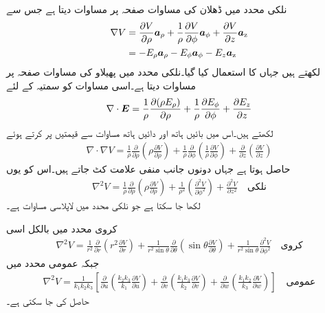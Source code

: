 نلکی محدد میں ڈھلان کی مساوات صفحہ  پر مساوات  دیتا ہے جس سے 
\begin{gather}
\begin{aligned}\label{مساوات_لاپلاس_نلکی_پھیلاو_الف}
\nabla V &= \frac{\partial V}{\partial \rho} {\boldsymbol{a}}_{\rho}+\frac{1}{\rho}\frac{\partial V}{\partial \phi}  {\boldsymbol{a}}_{\phi}+\frac{\partial V}{\partial z}{\boldsymbol{a}}_{\textup{z}}\\
&=-E_\rho {\boldsymbol{a}}_{\rho}-E_\phi {\boldsymbol{a}}_{\phi}-E_z {\boldsymbol{a}}_{\textup{z}} 
\end{aligned}
\end{gather}
لکھتے  ہیں جہاں  کا استعمال کیا گیا۔نلکی محدد میں پھیلاو کی مساوات صفحہ  پر مساوات  دیتا ہے۔اسی مساوات کو سمتیہ  کے لئے
 \begin{align*}
\nabla \cdot {\ensuremath{{\boldsymbol{E}}}}=\frac{1}{\rho}\frac{\partial (\rho E_{\rho})}{\partial \rho}+\frac{1}{\rho}\frac{\partial E_{\phi}}{\partial \phi}  +  \frac{\partial E_{z}}{\partial z}
\end{align*}
لکھتے ہیں۔اس میں بائیں ہاتھ   اور دائیں ہاتھ مساوات  سے قیمتیں پر کرتے ہوئے
\begin{align*}
\nabla \cdot \nabla V=\frac{1}{\rho}\frac{\partial }{\partial \rho}\left(\rho \frac{\partial V}{\partial \rho}\right)
+\frac{1}{\rho}\frac{\partial }{\partial \phi}\left(\frac{1}{\rho}\frac{\partial V}{\partial \phi}  \right) 
+  \frac{\partial}{\partial z} \left(\frac{\partial V}{\partial z} \right)
\end{align*}
حاصل ہوتا ہے جہاں دونوں جانب منفی علامت کٹ جاتے ہیں۔اس کو یوں
\begin{align}
\nabla^2 V=\frac{1}{\rho}\frac{\partial }{\partial \rho}\left(\rho \frac{\partial V}{\partial \rho}\right)
+\frac{1}{\rho^2}\left(\frac{\partial^2 V}{\partial \phi^2}  \right) 
+  \frac{\partial^2 V}{\partial z^2}\quad {\textrm{نلکی}}
\end{align}
 لکھا جا سکتا ہے جو نلکی محدد میں لاپلاسی مساوات ہے۔

کروی محدد میں بالکل اسی
\begin{align}\label{مساوات_لاپلاس_کروی_لاپلاسی}
\nabla^2 V=\frac{1}{r^2} \frac{\partial}{\partial r} \left(r^2\frac{\partial V}{\partial r} \right)+\frac{1}{r^2 \sin \theta} \frac{\partial}{\partial \theta} \left(\sin \theta \frac{\partial V}{\partial \theta}  \right)+\frac{1}{r^2 \sin \theta}\frac{\partial^2 V}{\partial \phi^2} \quad {\textrm{کروی}}
\end{align}
جبکہ عمومی محدد میں
\begin{align}\label{مساوات_لاپلاس_عمومی_لاپلاسی}
\nabla^2 V=\frac{1}{k_1 k_2 k_3}\left[\frac{\partial}{\partial u}\left(\frac{k_2 k_3}{k_1}\frac{\partial V}{\partial u} \right)+\frac{\partial}{\partial v}\left(\frac{k_1 k_3}{k_2}\frac{\partial V}{\partial v} \right) +\frac{\partial}{\partial w}\left(\frac{k_1 k_2}{k_3}\frac{\partial V}{\partial w} \right)\right] \quad{\textrm{عمومی}}
\end{align}
حاصل کی جا سکتی ہے۔

